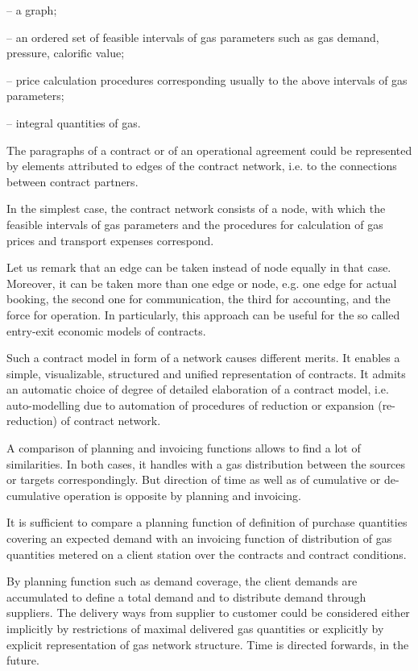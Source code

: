 \documentclass{article}
\begin{document}
\qquad -- a graph;

\qquad -- an ordered set of feasible intervals of gas parameters such as gas
demand, pressure, calorific value;

\qquad -- price calculation procedures corresponding usually to the above
intervals of gas parameters;

\qquad -- integral quantities of gas.

The paragraphs of a contract or of an operational agreement could be
represented by elements attributed to edges of the contract network, i.e. to
the connections between contract partners.

In the simplest case, the contract network consists of a node, with which
the feasible intervals of gas parameters and the procedures for calculation
of gas prices and transport expenses correspond.

Let us remark that an edge can be taken instead of node equally in that
case. Moreover, it can be taken more than one edge or node, e.g. one edge
for actual booking, the second one for communication, the third for
accounting, and the force for operation. In particularly, this approach can
be useful for the so called entry-exit economic models of contracts.

Such a contract model in form of a network causes different merits. It
enables a simple, visualizable, structured and unified representation of
contracts. It admits an automatic choice of degree of detailed elaboration
of a contract model, i.e. auto-modelling due to automation of procedures of
reduction or expansion (re-reduction) of contract network.

A comparison of planning and invoicing functions allows to find a lot of
similarities. In both cases, it handles with a gas distribution between the
sources or targets correspondingly. But direction of time as well as of
cumulative or de-cumulative operation is opposite by planning and invoicing.

It is sufficient to compare a planning function of definition of purchase
quantities covering an expected demand with an invoicing function of
distribution of gas quantities metered on a client station over the
contracts and contract conditions.

By planning function such as demand coverage, the client demands are
accumulated to define a total demand and to distribute demand through
suppliers. The delivery ways from supplier to customer could be considered
either implicitly by restrictions of maximal delivered gas quantities or
explicitly by explicit representation of gas network structure. Time is
directed forwards, in the future.
\end{document}
